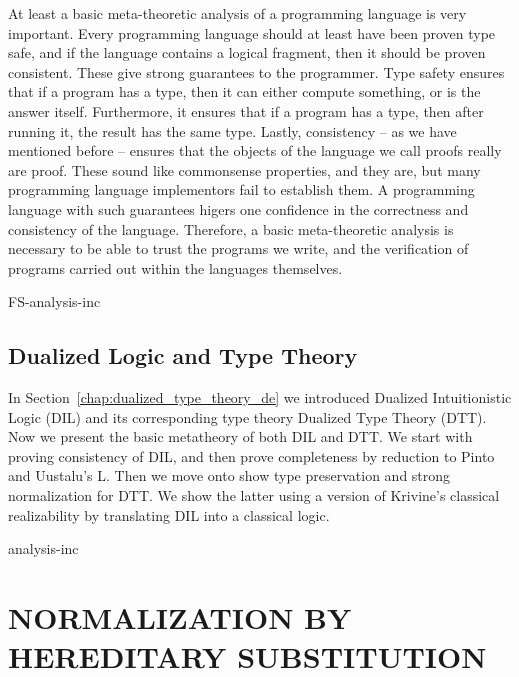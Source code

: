 \documentclass[phd,dedicationpage,ackpage,epigraphpage,figures]{uithesis}
\begin{document}
At least a basic meta-theoretic analysis of a programming language is
very important.  Every programming language should at least have been
proven type safe, and if the language contains a
logical fragment, then it should be proven consistent.  These give
strong guarantees to the programmer.  Type safety ensures that if a
program has a type, then it can either compute something, or is the
answer itself.  Furthermore, it ensures that if a program has a type,
then after running it, the result has the same type.  Lastly,
consistency -- as we have mentioned before --
ensures that the objects of the language we call proofs really are
proof.  These sound like commonsense properties, and they are, but
many programming language implementors fail to establish them.  A
programming language with such guarantees higers one confidence in the
correctness and consistency of the language.  Therefore, a basic
meta-theoretic analysis is necessary to be able to trust the programs
we write, and the verification of programs carried out within the
languages themselves.

{FS-analysis-inc}

\chapter{Dualized Logic and Type Theory}
\label{chap:dualized_type_theory_anal}

In Section~\ref{chap:dualized_type_theory_de} we introduced Dualized
Intuitionistic Logic (DIL) and its corresponding type theory Dualized
Type Theory (DTT).  Now we present the basic metatheory of both DIL
and DTT.  We start with proving consistency of DIL, and then prove
completeness by reduction to Pinto and Uustalu's L. Then we move onto
show type preservation and strong normalization for DTT.  We show the
latter using a version of Krivine's classical realizability by
translating DIL into a classical logic.

{analysis-inc}

\part{NORMALIZATION BY HEREDITARY SUBSTITUTION}
\label{part:norm-hs}
\end{document}
